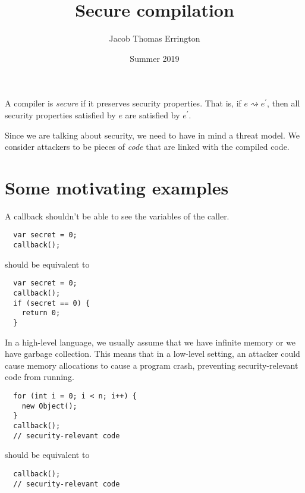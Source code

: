 \documentclass[11pt]{article}
\title{Secure compilation}
\author{Jacob Thomas Errington}
\date{Summer 2019}
\newcommand{\compile}{\rightsquigarrow}
\begin{document}
\maketitle

\begin{defn}
  A compiler is \emph{secure} if it preserves security properties.
  That is, if $e \compile e^\prime$, then all security properties satisfied by
  $e$ are satisfied by $e^\prime$.
\end{defn}

Since we are talking about security, we need to have in mind a threat model.
We consider attackers to be pieces of \emph{code} that are linked with the
compiled code.

\section{Some motivating examples}

\begin{eg}
  A callback shouldn't be able to see the variables of the caller.

  \begin{lstlisting}
  var secret = 0;
  callback();
  \end{lstlisting}
  
  should be equivalent to
  
  \begin{lstlisting}
  var secret = 0;
  callback();
  if (secret == 0) {
    return 0;
  }
  \end{lstlisting}
\end{eg}

\begin{eg}
  In a high-level language, we usually assume that we have infinite memory or we
  have garbage collection. This means that in a low-level setting, an attacker
  could cause memory allocations to cause a program crash, preventing
  security-relevant code from running.

  \begin{lstlisting}
  for (int i = 0; i < n; i++) {
    new Object();
  }
  callback();
  // security-relevant code
  \end{lstlisting}
  
  should be equivalent to
  
  \begin{lstlisting}
  callback();
  // security-relevant code
  \end{lstlisting}
\end{eg}
\end{document}
